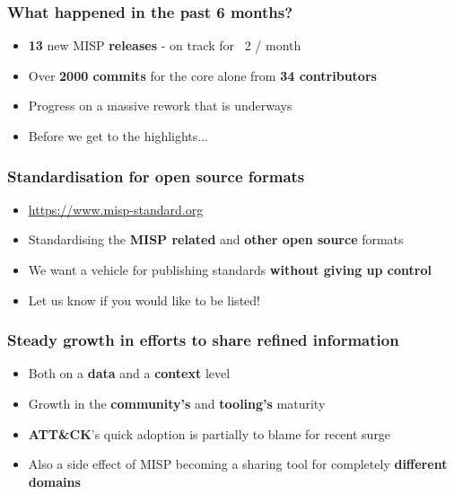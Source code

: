 
\begin{frame}
\titlepage
\end{frame}

\begin{frame}
  \frametitle{What happened in the past 6 months?}
  \begin{itemize}
    \item {\bf 13} new MISP {\bf releases} - on track for ~2 / month
    \item Over {\bf 2000 commits} for the core alone from {\bf 34 contributors}
    \item Progress on a massive rework that is underways
    \item Before we get to the highlights...
  \end{itemize}
\end{frame}

\begin{frame}
  \frametitle{Standardisation for open source formats}
  \begin{itemize}
    \item \url{https://www.misp-standard.org}
    \item Standardising the {\bf MISP related} and {\bf other open source} formats
    \item We want a vehicle for publishing standards {\bf without giving up control}
    \item Let us know if you would like to be listed!
  \end{itemize}
\end{frame}

\begin{frame}
  \frametitle{Steady growth in efforts to share refined information}
  \begin{itemize}
    \item Both on a {\bf data} and a {\bf context} level
    \item Growth in the {\bf community's} and {\bf tooling's} maturity
    \item {\bf ATT\&CK}'s quick adoption is partially to blame for recent surge
    \item Also a side effect of MISP becoming a sharing tool for completely {\bf different domains}
  \end{itemize}
\end{frame}

